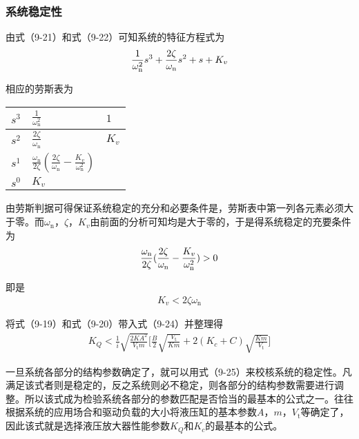 \subsubsection{系统稳定性}

由式（9-21）和式（9-22）可知系统的特征方程式为
\begin{align}
    \frac{1}{\omega_{\text{n}}^2}s^3+\frac{2\zeta }{\omega_{\text{n}}}s^2+s+K_{v} \notag
\end{align}

相应的劳斯表为

\begin{table*}
\centering
\renewcommand\arraystretch{1.5}
\begin{tabular}{p{1cm}<{\centering}|p{2.5cm}<{\centering}p{1cm}<{\centering}}
    $s^3$   &   $\frac{1}{\omega_{\text{n}}^2}$     &   $1$ \\
    \hline
    $s^2$   &   $\frac{2\zeta}{\omega_{\text{n}}}$  &   $K_{v}$\\
    \hline
    $s^1$   &   $\frac{\omega_{\text{n}}}{2\zeta}(\frac{2\zeta}{\omega_{\text{n}}}-\frac{K_{v}}{\omega_{\text{n}}^2})$   &   \\
    \hline
    $s^0$   &   $K_{v}$                             &            \\
\end{tabular}
\end{table*}

由劳斯判据可得保证系统稳定的充分和必要条件是，劳斯表中第一列各元素必须大于零。而$\omega_{\text{n}}$，$\zeta $，$K_{v}$由前面的分析可知均是大于零的，于是得系统稳定的充要条件为
\begin{align}
    \frac{\omega_{\text{n}}}{2\zeta }(\frac{2\zeta }{\omega_{\text{n}}}-\frac{K_{v}}{\omega_{\text{n}}^2})>0 \notag
\end{align}

\noindent 即是
\begin{align}
    K_{v}<2\zeta \omega_{\text{n}}
\end{align}

\noindent 将式（9-19）和式（9-20）带入式（9-24）并整理得
\begin{align}
    K_{Q}<\frac{1}{i}\sqrt{\frac{2KA^2}{V_{\text{t}}m}}\Bigg[\frac{B}{2}\sqrt{\frac{V_{\text{t}}}{Km}}+2(K_{c}+C)\sqrt{\frac{Km}{V_{\text{t}}}}\Bigg]
\end{align}

一旦系统各部分的结构参数确定了，就可以用式（9-25）来校核系统的稳定性。凡满足该式者则是稳定的，反之系统则必不稳定，则各部分的结构参数需要进行调整。所以该式成为检验系统各部分的参数匹配是否恰当的最基本的公式之一。往往根据系统的应用场合和驱动负载的大小将液压缸的基本参数$A$，$m$，$V_{\text{t}}$等确定了，因此该式就是选择液压放大器性能参数$K_{Q}$和$K_{c}$的最基本的公式。

